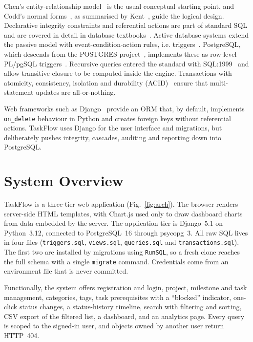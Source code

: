 \documentclass[conference]{IEEEtran}
\begin{document}
Chen's entity-relationship model~\cite{chen1976} is the usual conceptual
starting point, and Codd's normal forms~\cite{codd1972}, as summarised by
Kent~\cite{kent1983}, guide the logical design. Declarative integrity
constraints and referential actions are part of standard SQL and are covered in
detail in database textbooks~\cite{silberschatz2019,elmasri2016,ramakrishnan2003}.
Active database systems extend the passive model with event-condition-action
rules, i.e. triggers~\cite{widom1996}. PostgreSQL, which descends from the
POSTGRES project~\cite{stonebraker1986}, implements these as row-level PL/pgSQL
triggers~\cite{pgdocs}. Recursive queries entered the standard with
SQL:1999~\cite{sql1999} and allow transitive closure to be computed inside the
engine. Transactions with atomicity, consistency, isolation and durability
(ACID)~\cite{haerder1983,gray1993} ensure that multi-statement updates are
all-or-nothing.

Web frameworks such as Django~\cite{djangodocs} provide an ORM that, by default,
implements \texttt{on\_delete} behaviour in Python and creates foreign keys
without referential actions. TaskFlow uses Django for the user interface and
migrations, but deliberately pushes integrity, cascades, auditing and reporting
down into PostgreSQL.

\section{System Overview}

TaskFlow is a three-tier web application (Fig.~\ref{fig:arch}). The browser
renders server-side HTML templates, with Chart.js used only to draw dashboard
charts from data embedded by the server. The application tier is Django~5.1 on
Python~3.12, connected to PostgreSQL~16 through psycopg~3. All raw SQL lives in
four files (\texttt{triggers.sql}, \texttt{views.sql}, \texttt{queries.sql} and
\texttt{transactions.sql}). The first two are installed by migrations using
\texttt{RunSQL}, so a fresh clone reaches the full schema with a single
\texttt{migrate} command. Credentials come from an environment file that is
never committed.

Functionally, the system offers registration and login, project, milestone and
task management, categories, tags, task prerequisites with a ``blocked''
indicator, one-click status changes, a status-history timeline, search with
filtering and sorting, CSV export of the filtered list, a dashboard, and an
analytics page. Every query is scoped to the signed-in user, and objects owned
by another user return HTTP~404.
\end{document}
